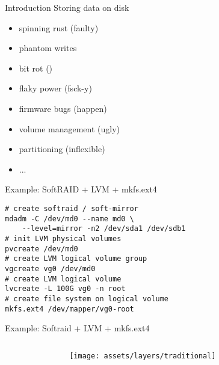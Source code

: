 \begin{frame}{Introduction}
	Storing data on disk
	\pause
	\begin{itemize}
		\item spinning rust \pause (faulty) \pause
		\item phantom writes \pause
		\item bit rot \pause () \pause 
		\item flaky power \pause (fsck-y) \pause
		\item firmware bugs (happen) \pause
		
		\item volume management \pause (ugly) \pause
		\item partitioning \pause (inflexible)
		\item ... \pause
	\end{itemize}
\end{frame}


\begin{frame}[fragile]{Example: SoftRAID + LVM + mkfs.ext4}
\begin{verbatim}
# create softraid / soft-mirror
mdadm -C /dev/md0 --name md0 \
    --level=mirror -n2 /dev/sda1 /dev/sdb1
# init LVM physical volumes
pvcreate /dev/md0
# create LVM logical volume group
vgcreate vg0 /dev/md0
# create LVM logical volume
lvcreate -L 100G vg0 -n root
# create file system on logical volume
mkfs.ext4 /dev/mapper/vg0-root
\end{verbatim}

\end{frame}


\begin{frame}{Example: Softraid + LVM + mkfs.ext4}
	\begin{columns}
		\begin{column}{0.25\linewidth}
			
		\end{column}
		\begin{column}{0.5\linewidth}
			\begin{figure}
				\texttt{[image: assets/layers/traditional]}
			\end{figure}			
		\end{column}
		\begin{column}{0.25\linewidth}
			
		\end{column}
	\end{columns}

\end{frame}

